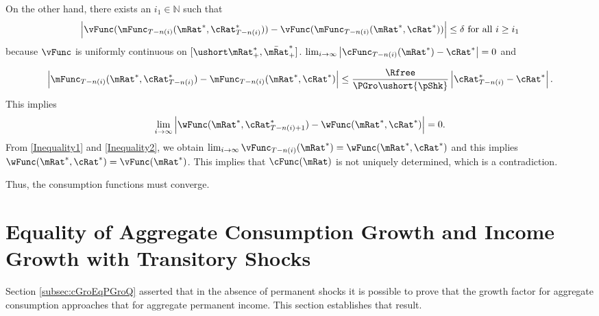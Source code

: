 \documentclass[titlepage]{\econtex}\providecommand{\texname}{BufferStockTheory}
\begin{document}
On the other hand, there exists an $i_{1} \in \mathbb{N}$ such that
\begin{equation}
\left\vert \vFunc( \mFunc_{T-n( i) }( \mRat^{*},
\cRat^{*}_{T-n( i) }) ) -\vFunc( \mFunc
_{T-n( i) }( \mRat^{*},\cRat^{*}) )
\right\vert \leq \delta \text{ for all }i\geq i_{1}
\end{equation}
because $\vFunc$ is uniformly continuous on $[\ushort\mRat_{+}^{*},\bar\mRat_{+}^{*}]$. $\lim_{i\rightarrow \infty }\left\vert \cFunc_{T-n(i)}(\mRat^{*})-\cRat^{*}
\right\vert =0$ and

\begin{equation}
\left\vert \mFunc_{T-n( i) }( \mRat^{*},\cRat^{*}
_{T-n( i) }) -\mFunc_{T-n( i) }(
\mRat^{*},\cRat^{*}) \right\vert \leq \frac{\Rfree}{\PGro\ushort{\pShk}}
\left\vert \cRat^{*}_{T-n( i) }-\cRat^{*}\right\vert.
\end{equation}
This implies
\begin{equation}
\lim_{i\rightarrow \infty }\left\vert \wFunc(\mRat^{*},\cRat^{*}_{T-n(i)+1}) -\wFunc(\mRat^{*},\cRat^{*})
\right\vert =0  \label{Inequality2}.
\end{equation}
From \eqref{Inequality1} and \eqref{Inequality2}, we obtain $\lim_{i\rightarrow \infty }\vFunc_{T-n(i)}(\mRat^{*}
)=\wFunc( \mRat^{*},\cRat^{*}) $ and this implies $\wFunc(
\mRat^{*},\cRat^{*}) =\vFunc(\mRat^{*})$. This implies that $
\cFunc(\mRat)$ is not uniquely determined, which is a contradiction.

Thus, the consumption functions must converge.


\section{Equality of Aggregate Consumption Growth and Income Growth with Transitory Shocks}\label{sec:CGroEqPGro}

Section \ref{subsec:cGroEqPGroQ} asserted that in the absence of permanent shocks it is possible to prove
that the growth factor for aggregate consumption approaches that for aggregate permanent
income.  This section establishes that result.
\end{document}
